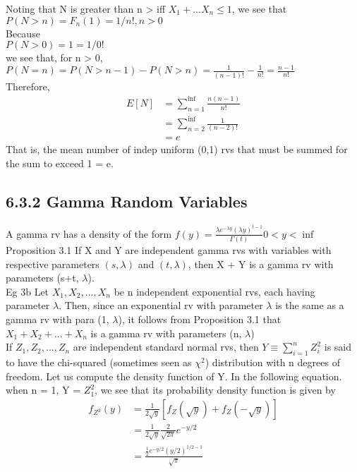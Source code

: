 \documentclass{article}
\begin{document}
Noting that N is greater than n > iff $X_1 + ...  X_n \leq 1$, we see that \\
$ P(N>n) = F_n(1) = 1/n!, n>0$ \\
Because \\
$ P(N>0) = 1 = 1/0!$ \\
we see that, for n > 0, \\
$ P(N = n) = P(N > n-1) - P(N > n) = \frac{1}{(n-1)!} - \frac{1}{n!} = \frac{n-1}{n!}$ \\ 
Therefore, 
\begin{align*}
    E[N]&= \sum_{n=1}^{\inf}\frac{n(n-1)}{n!} \\
        &= \sum_{n=2}^{\inf}\frac{1}{(n-2)!} \\
        &= e
\end{align*}
That is, the mean number of indep uniform (0,1) rvs that must be summed for the sum to exceed 1 = e. 

\subsection*{6.3.2 Gamma Random Variables}
A gamma rv has a density of the form $f(y) = \frac{\lambda e^{-\lambda y}(\lambda y)^{t-1}}{\Gamma(t)} 0 < y < \inf$
\\
Proposition 3.1 If X and Y are independent gamma rvs with variables with respective parameters $(s, \lambda)$ and $(t, \lambda)$, then X + Y is a gamma rv with parameters (s+t, $\lambda$). \\
Eg 3b Let $X_1, X_2, ..., X_n$ be n independent exponential rvs, each having parameter $\lambda$. Then, since an exponential rv with parameter $\lambda$ is the same as a gamma rv with para (1, $\lambda$), it follows from Proposition 3.1 that $X_1 + X_2 + ... + X_n$ is a gamma rv with parameters (n, $\lambda$)\\
If $Z_1, Z_2, ..., Z_n$ are independent standard normal rvs, then $Y \equiv \sum_{i=1}^n Z_i^2$ is said to have the chi-squared (sometimes seen as $\chi^2$) distribution with n degrees of freedom. Let us compute the density function of Y. In the following equation. when n = 1, Y = $Z_1^2$, we see that its probability density function is given by 
\begin{align*}
    f_{Z^2}(y) &= \frac{1}{2\sqrt{y}}[f_Z(\sqrt{y}) + f_Z(-\sqrt{y})]\\
        &= \frac{1}{2\sqrt{y}} \frac{2}{\sqrt{2\pi}} e^{-y/2} \\
        &= \frac{\frac{1}{2}e^{-y/2}(y/2)^{1/2-1}}{\sqrt{\pi}}
\end{align*}
\end{document}
